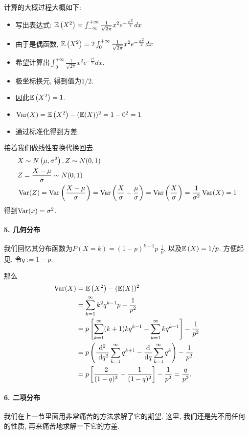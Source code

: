 计算的大概过程大概如下: 
\begin{itemize}
    \item 写出表达式: $\mathbb E\left(X^2\right)=\int_{-\infty}^{+\infty} \frac{1}{\sqrt{2 \pi}} x^2 e^{-\frac{x^2}{2}} d x$
    \item 由于是偶函数, $\mathbb E\left(X^2\right)=2 \int_0^{+\infty} \frac{1}{\sqrt{2 \pi}} x^2 e^{-\frac{x^2}{2}} d x$
    \item 希望计算出$\int_0^{+\infty} \frac{1}{\sqrt{2 \pi}} x^2 e^{-\frac{x^2}{2}} d x$.
    \item 极坐标换元, 得到值为$1/2$.
    \item 因此$\mathbb E\left(X^2\right)=1$.
    \item $\operatorname{Var}(X)=\mathbb E\left(X^2\right)-(\mathbb E(X))^2=1-0^2=1$
    \item 通过标准化得到方差
\end{itemize}

接着我们做线性变换代换回去. 
$$
\begin{aligned}
& X \sim N\left(\mu, \sigma^2\right), Z \sim N(0,1) \\
& Z=\frac{X-\mu}{\sigma} \sim N(0,1) \\
& \operatorname{Var}(Z)=\operatorname{Var}\left(\frac{X-\mu}{\sigma}\right)=\operatorname{Var}\left(\frac{X}{\sigma}-\frac{\mu}{\sigma}\right)=\operatorname{Var}\left(\frac{X}{\sigma}\right)=\frac{1}{\sigma^2} \operatorname{Var}(X)=1
\end{aligned}
$$
得到$\operatorname{Var}(x)=\sigma^2$.

\paragraph{5. 几何分布 } 我们回忆其分布函数为$P(X=k)=(1-p)^{k-1} p$ $\frac{1}{p}$, 以及$\mathbb E\left(X\right)=1/p$. 方便起见, 令$q:=1-p$. 

那么
$$\begin{aligned} \operatorname{Var}(X) & =\mathbb E\left(X^2\right)-(\mathbb E(X))^2 \\ & =\sum_{k=1}^{\infty} k^2 q^{k-1} p-\frac{1}{p^2} \\ & =p\left[\sum_{k=1}^{\infty}(k+1) k q^{k-1}-\sum_{k=1}^{\infty} k q^{k-1}\right]-\frac{1}{p^2} \\ & =p\left(\frac{\mathrm{d}^2}{\mathrm{~d} q^2} \sum_{k=1}^{\infty} q^{k+1}-\frac{\mathrm{d}}{\mathrm{d} q} \sum_{k=1}^{\infty} q^k\right)-\frac{1}{p^2} \\ & =p\left[\frac{2}{(1-q)^3}-\frac{1}{(1-q)^2}\right]-\frac{1}{p^2}=\frac{q}{p^2} .\end{aligned}$$

\paragraph{6. 二项分布} 
我们在上一节里面用非常痛苦的方法求解了它的期望. 这里, 我们还是先不用任何的性质, 再来痛苦地求解一下它的方差. 

